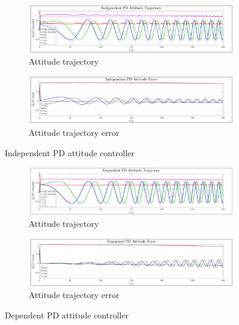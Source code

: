 \begin{figure}[htbp]
\centering
\vspace{-10pt}
\begin{subfigure}{0.9\textwidth}
\centering
\includegraphics[width=\textwidth]{graphs/PD_Diagonal_Independent_Trajectory}
\vspace{-18pt}
\caption{Attitude trajectory}
\label{fig:independent_diagonal_trajectory}
\end{subfigure}
\begin{subfigure}{0.9\textwidth}
\centering
\includegraphics[width=\textwidth]{graphs/PD_Diagonal_Independent_Error}
\vspace{-18pt}
\caption{Attitude trajectory error}
\label{fig:independent_diagonal_error}
\end{subfigure}
\vspace{-10pt}
\caption{Independent PD attitude controller}
\label{fig:independent}
\end{figure}
\begin{figure}[htbp]
\centering
\vspace{-20pt}
\begin{subfigure}{0.9\textwidth}
\centering
\includegraphics[width=\textwidth]{graphs/PD_Diagonal_Dependent_Trajectory}
\vspace{-18pt}
\caption{Attitude trajectory}
\label{fig:dependent_diagonal_trajectory}
\end{subfigure}
\begin{subfigure}{0.9\textwidth}
\centering
\includegraphics[width=\textwidth]{graphs/PD_Diagonal_Dependent_Error}
\vspace{-18pt}
\caption{Attitude trajectory error}
\label{fig:dependent_diagonal_error}
\end{subfigure}
\vspace{-10pt}
\caption{Dependent PD attitude controller}
\label{fig:dependent}
\end{figure}
